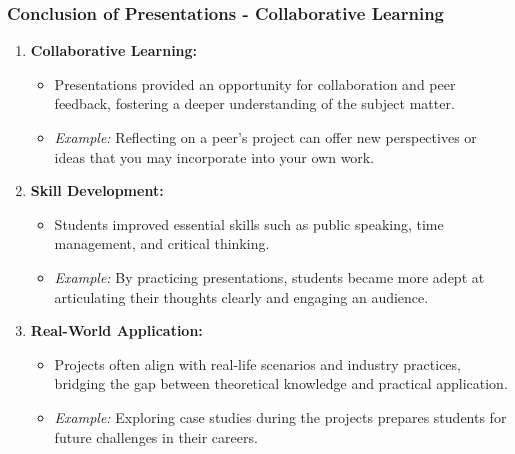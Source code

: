 \documentclass[aspectratio=169]{beamer}
\begin{document}
\begin{frame}[fragile]
  \frametitle{Conclusion of Presentations - Collaborative Learning}
  \begin{enumerate}
    \item \textbf{Collaborative Learning:}
      \begin{itemize}
        \item Presentations provided an opportunity for collaboration and peer feedback, fostering a deeper understanding of the subject matter.
        \item \textit{Example:} Reflecting on a peer’s project can offer new perspectives or ideas that you may incorporate into your own work.
      \end{itemize}
    \item \textbf{Skill Development:}
      \begin{itemize}
        \item Students improved essential skills such as public speaking, time management, and critical thinking. 
        \item \textit{Example:} By practicing presentations, students became more adept at articulating their thoughts clearly and engaging an audience.
      \end{itemize}
    \item \textbf{Real-World Application:}
      \begin{itemize}
        \item Projects often align with real-life scenarios and industry practices, bridging the gap between theoretical knowledge and practical application.
        \item \textit{Example:} Exploring case studies during the projects prepares students for future challenges in their careers.
      \end{itemize}
  \end{enumerate}
\end{frame}
\end{document}
